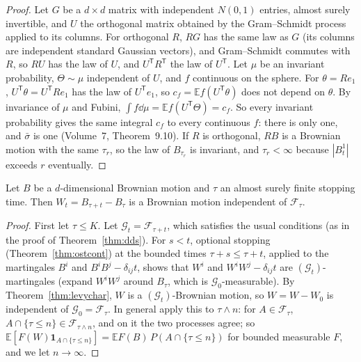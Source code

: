 \begin{proof}
Let $G$ be a $d\times d$ matrix with independent $N(0,1)$ entries, almost surely invertible, and $U$ the orthogonal matrix obtained by the Gram--Schmidt process applied to its columns. For orthogonal $R$, $RG$ has the same
law as $G$ (its columns are independent standard Gaussian vectors), and Gram--Schmidt commutes with $R$, so $RU$ has the law of $U$, and $U^{\mathsf T}R^{\mathsf T}$ the law of $U^{\mathsf T}$. Let $\mu$ be an invariant
probability, $\Theta\sim\mu$ independent of $U$, and $f$ continuous on the sphere. For $\theta=Re_1$, $U^{\mathsf T}\theta=U^{\mathsf T}Re_1$ has the law of $U^{\mathsf T}e_1$, so $c_f=\mathbb Ef(U^{\mathsf T}\theta)$ does not depend on $\theta$.
By invariance of $\mu$ and Fubini, $\int f\dd\mu=\mathbb Ef(U^{\mathsf T}\Theta)=c_f$. So every invariant probability gives the same integral $c_f$ to every continuous $f$: there is only one, and $\bar\sigma$ is one (Volume~7,
Theorem~9.10). If $R$ is orthogonal, $RB$ is a Brownian motion with the same $\tau_r$, so the law of $B_{\tau_r}$ is invariant, and $\tau_r<\infty$ because $|B^1_t|$ exceeds $r$ eventually.
\end{proof}

\begin{proposition}\label{prop:strongmarkovd}
Let $B$ be a $d$-dimensional Brownian motion and $\tau$ an almost surely finite stopping time. Then $W_t=B_{\tau+t}-B_\tau$ is a Brownian motion independent of $\mathcal F_\tau$.
\end{proposition}

\begin{proof}
First let $\tau\le K$. Let $\mathcal G_t=\mathcal F_{\tau+t}$, which satisfies the usual conditions (as in the proof of Theorem~\ref{thm:dds}). For $s<t$, optional stopping (Theorem~\ref{thm:ostcont}) at the bounded times
$\tau+s\le\tau+t$, applied to the martingales $B^i$ and $B^iB^j-\delta_{ij}t$, shows that $W^i$ and $W^iW^j-\delta_{ij}t$ are $(\mathcal G_t)$-martingales (expand $W^iW^j$ around $B_\tau$, which is
$\mathcal G_0$-measurable). By Theorem~\ref{thm:levychar}, $W$ is a $(\mathcal G_t)$-Brownian motion, so $W=W-W_0$ is independent of $\mathcal G_0=\mathcal F_\tau$. In general apply this to $\tau\wedge n$: for $A\in\mathcal F_\tau$,
$A\cap\{\tau\le n\}\in\mathcal F_{\tau\wedge n}$, and on it the two processes agree; so $\mathbb E[F(W)\mathbf 1_{A\cap\{\tau\le n\}}]=\mathbb EF(B)\,P(A\cap\{\tau\le n\})$ for bounded measurable $F$, and we let $n\to\infty$.
\end{proof}

